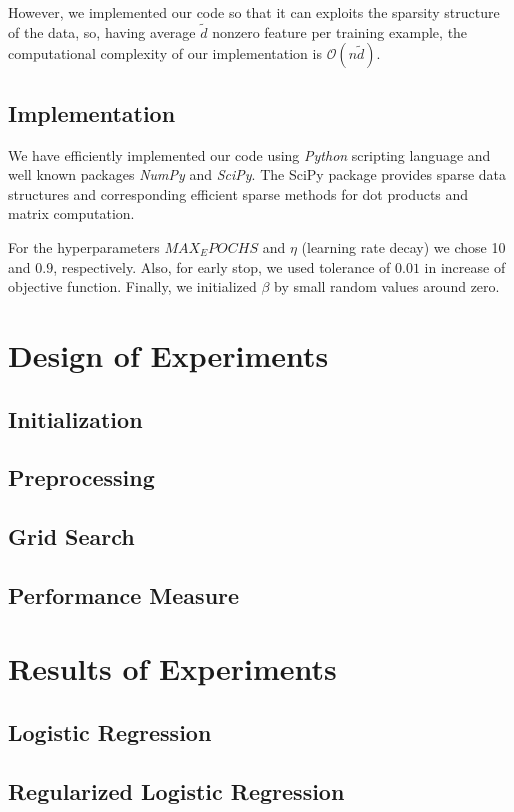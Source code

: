 \documentclass[twoside,12pt]{article}
\begin{document}
However, we implemented our code so that it can exploits the sparsity structure of the data, so, having average $\tilde{d}$ nonzero feature per training example, the computational complexity of our implementation is $\mathcal{O}(n\tilde{d})$.

\subsection{Implementation}
We have efficiently implemented our code using \emph{Python} scripting language and well known packages \emph{NumPy} and \emph{SciPy}. The SciPy package provides sparse data structures and corresponding efficient sparse methods for dot products and matrix computation.

For the hyperparameters $MAX_EPOCHS$ and $\eta$ (learning rate decay) we chose 10 and $0.9$, respectively. Also, for early stop, we used tolerance of $0.01$ in increase of objective function. Finally, we initialized $\beta$ by small random values around zero.

\section{Design of Experiments}
\subsection{Initialization}
\subsection{Preprocessing}
\subsection{Grid Search}
\subsection{Performance Measure}


\section{Results of Experiments}
\subsection{Logistic Regression}
\subsection{Regularized Logistic Regression}
\end{document}
